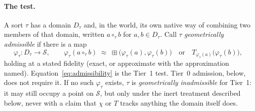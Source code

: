 \documentclass[12pt, a4paper]{article}
\begin{document}
\paragraph{The test.} A sort $\tau$ has a domain $D_\tau$ and, in the
world, its own native way of combining two members of that domain,
written $a \circ_\tau b$ for $a,b \in D_\tau$. Call $\tau$
\emph{geometrically admissible} if there is a map
\begin{equation}
    \varphi_\tau : D_\tau \longrightarrow \mathcal{S}, \qquad
    \varphi_\tau(a \circ_\tau b) \;\approx\;
    \boxplus\bigl(\varphi_\tau(a), \varphi_\tau(b)\bigr)
    \quad \text{or} \quad
    T_{\varphi_\tau(a)}\bigl(\varphi_\tau(b)\bigr),
    \label{eq:admissibility}
\end{equation}
holding at a stated fidelity (exact, or approximate with the
approximation named). Equation~\eqref{eq:admissibility} is the
Tier~1 test. Tier~0 admission, below, does not require it.
If no such $\varphi_\tau$ exists, $\tau$ is
\emph{geometrically inadmissible} for Tier~1: it may still occupy a point on
$\mathcal{S}$, but only under the inert treatment described below,
never with a claim that $\chi$ or $T$ tracks anything the domain
itself does.
\end{document}
